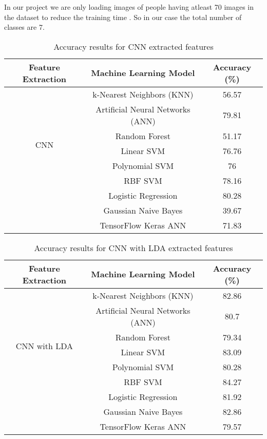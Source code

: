\documentclass[a4paper]{article}
\theoremstyle{plain}
\theoremstyle{definition}
\begin{document}
In our project we are only loading images of people having atleast 70 images in the dataset to reduce the training time . So in our case the total number of classes are 7.\vspace{8pt} 


\begin{table}[htbp]
\centering
\Large %
\caption{Accuracy results for CNN extracted features}
\label{tab:results}
\begin{tabular}{|c|c|c|}
\hline
\textbf{Feature Extraction} & \textbf{Machine Learning Model} & \textbf{Accuracy (\%)} \\ \hline
\multirow{7}{*}{CNN } & k-Nearest Neighbors (KNN) & 56.57 \\ \cline{2-3} 
 & Artificial Neural Networks (ANN) & 79.81 \\ \cline{2-3} 
 & Random Forest & 51.17 \\ \cline{2-3} 
 &  Linear SVM & 76.76 \\ \cline{2-3} 
 & Polynomial SVM & 76 \\ \cline{2-3} 
 & RBF SVM & 78.16 \\ \cline{2-3} 
 & Logistic Regression & 80.28 \\ \cline{2-3} 
 & Gaussian Naive Bayes & 39.67 \\ \cline{2-3}  
 & TensorFlow Keras ANN & 71.83 \\ \hline
\end{tabular}
\end{table}

\begin{table}[htbp]
\centering
\Large
\caption{Accuracy results for CNN with LDA extracted features}
\label{tab:results}
\begin{tabular}{|c|c|c|}
\hline
\textbf{Feature Extraction} & \textbf{Machine Learning Model} & \textbf{Accuracy (\%)} \\ \hline
\multirow{7}{*}{CNN with LDA } & k-Nearest Neighbors (KNN) & 82.86 \\ \cline{2-3} 
 & Artificial Neural Networks (ANN) & 80.7 \\ \cline{2-3} 
 & Random Forest & 79.34 \\ \cline{2-3} 
 &  Linear SVM & 83.09 \\ \cline{2-3} 
 & Polynomial SVM & 80.28 \\ \cline{2-3} 
 & RBF SVM & 84.27 \\ \cline{2-3} 
 & Logistic Regression & 81.92 \\ \cline{2-3} 
 & Gaussian Naive Bayes & 82.86 \\ \cline{2-3}  
 & TensorFlow Keras ANN & 79.57 \\ \hline
\end{tabular}
\end{table}
\end{document}
